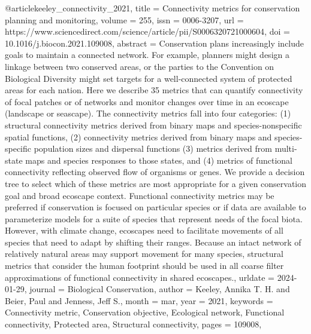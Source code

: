 {{{@article{keeley_connectivity_2021,
	title = {Connectivity metrics for conservation planning and monitoring},
	volume = {255},
	issn = {0006-3207},
	url = {https://www.sciencedirect.com/science/article/pii/S0006320721000604},
	doi = {10.1016/j.biocon.2021.109008},
	abstract = {Conservation plans increasingly include goals to maintain a connected network. For example, planners might design a linkage between two conserved areas, or the parties to the Convention on Biological Diversity might set targets for a well-connected system of protected areas for each nation. Here we describe 35 metrics that can quantify connectivity of focal patches or of networks and monitor changes over time in an ecoscape (landscape or seascape). The connectivity metrics fall into four categories: (1) structural connectivity metrics derived from binary maps and species-nonspecific spatial functions, (2) connectivity metrics derived from binary maps and species-specific population sizes and dispersal functions (3) metrics derived from multi-state maps and species responses to those states, and (4) metrics of functional connectivity reflecting observed flow of organisms or genes. We provide a decision tree to select which of these metrics are most appropriate for a given conservation goal and broad ecoscape context. Functional connectivity metrics may be preferred if conservation is focused on particular species or if data are available to parameterize models for a suite of species that represent needs of the focal biota. However, with climate change, ecoscapes need to facilitate movements of all species that need to adapt by shifting their ranges. Because an intact network of relatively natural areas may support movement for many species, structural metrics that consider the human footprint should be used in all coarse filter approximations of functional connectivity in shared ecoscapes.},
	urldate = {2024-01-29},
	journal = {Biological Conservation},
	author = {Keeley, Annika T. H. and Beier, Paul and Jenness, Jeff S.},
	month = mar,
	year = {2021},
	keywords = {Connectivity metric, Conservation objective, Ecological network, Functional connectivity, Protected area, Structural connectivity},
	pages = {109008},
}

}}}
